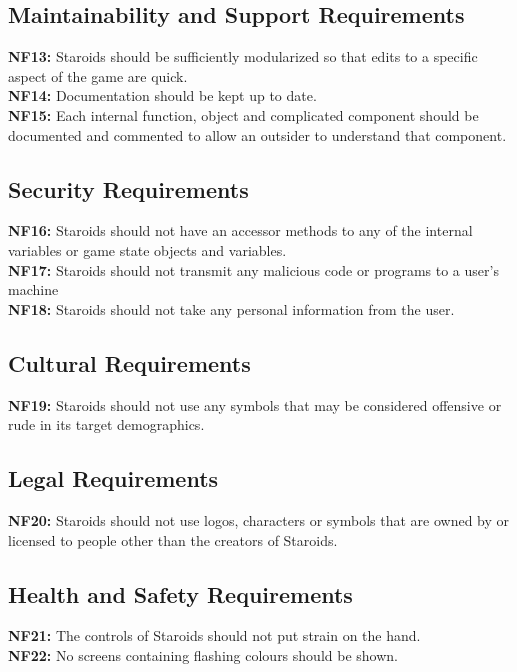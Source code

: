 \documentclass[12pt, titlepage]{article}
\begin{document}
\subsection{Maintainability and Support Requirements}
    \textbf{NF13:} Staroids should be sufficiently modularized so that edits to a specific aspect of the game are quick.\\
    \textbf{NF14:} Documentation should be kept up to date.\\
    \textbf{NF15:} Each internal function, object and complicated component should be documented and commented to allow an outsider to understand that component.\\

\subsection{Security Requirements}
    \textbf{NF16:} Staroids should not have an accessor methods to any of the internal variables or game state objects and variables.\\
    \textbf{NF17:} Staroids should not transmit any malicious code or programs to a user's machine\\
    \textbf{NF18:} Staroids should not take any personal information from the user.\\

\subsection{Cultural Requirements}
    \textbf{NF19:} Staroids should not use any symbols that may be considered offensive or rude in its target demographics.\\

\subsection{Legal Requirements}
    \textbf{NF20:} Staroids should not use logos, characters or symbols that are owned by or licensed to people other than the creators of Staroids.\\

\subsection{Health and Safety Requirements}
    \textbf{NF21:} The controls of Staroids should not put strain on the hand.\\
    \textbf{NF22:} No screens containing flashing colours should be shown.\\
\end{document}
